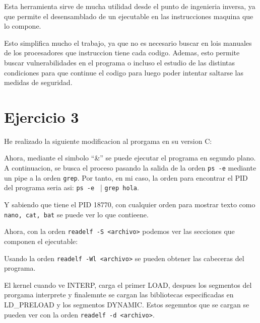 \documentclass{article}
\begin{document}
Esta herramienta sirve de mucha utilidad desde el punto de ingenieria inversa, ya que permite el desensamblado de un ejecutable en las instrucciones maquina que lo compone.


Esto simplifica mucho el trabajo, ya que no es necesario buscar en lois manuales de los procesadores que instruccion tiene cada codigo. Ademas, esto permite buscar vulnerabilidades en el programa o incluso el estudio de las distintas condiciones para que continue el codigo para luego poder intentar saltarse las medidas de seguridad.


\section*{Ejercicio 3}

He realizado la siguiente modificacion al prorgama en su version C:




Ahora, mediante el simbolo ``\&'' se puede ejecutar el programa en segundo plano. A continuacion, se busca el proceso pasando la salida de la orden \verb|ps -e| mediante un pipe a la orden \verb|grep|. Por tanto, en mi caso, la orden para encontrar el PID del programa seria asi: \verb|ps -e | | \verb|grep hola|.


Y sabiendo que tiene el PID 18770, con cualquier orden para mostrar texto como \verb|nano, cat, bat| se puede ver lo que contieene.


Ahora, con la orden \verb|readelf -S <archivo>| podemos ver las secciones que componen el ejecutable:


Usando la orden \verb|readelf -Wl <archivo>| se pueden obtener las cabeceras del programa.



El kernel cuando ve INTERP, carga el primer LOAD, despues los segmentos del prorgama interprete y finalemnte se cargan las bibliotecas especificadas en LD\_PRELOAD y los segmentos DYNAMIC. Estos segemntos que se cargan se pueden ver con la orden \verb|readelf -d <archivo>|.

\end{document}

